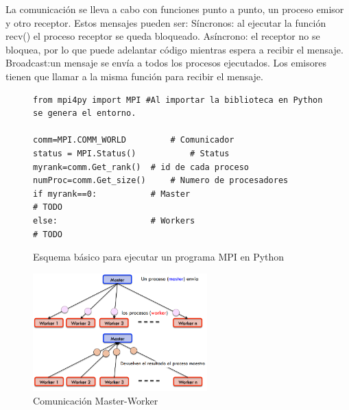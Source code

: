 La comunicación se lleva a cabo con funciones punto a punto, un proceso emisor y otro receptor. Estos mensajes pueden ser:
Síncronos: al ejecutar la función recv() el proceso receptor se queda bloqueado.
Asíncrono: el receptor no se bloquea, por lo que puede adelantar código mientras espera a recibir el mensaje.
Broadcast:un mensaje se envía a todos los procesos ejecutados. Los emisores tienen que llamar a la misma función para recibir el mensaje.




\begin{figure}[!h]
		
\begin{lstlisting}[frame=single]
from mpi4py import MPI #Al importar la biblioteca en Python se genera el entorno.

comm=MPI.COMM_WORLD     	# Comunicador
status = MPI.Status()   		# Status
myrank=comm.Get_rank() 	# id de cada proceso
numProc=comm.Get_size() 	# Numero de procesadores
if myrank==0:           # Master
# TODO
else:                   # Workers
# TODO	
\end{lstlisting}
\caption{Esquema básico para ejecutar un programa MPI en Python}
\label{fig:esquea_mpi}
\end{figure}


\begin{figure}[!h]
	\centering
	\includegraphics[width=0.6\textwidth]{images/chapter_2/mpi_1}
	\caption{Comunicación Master-Worker}
	\label{fig:comunicacion_mw}
\end{figure}

